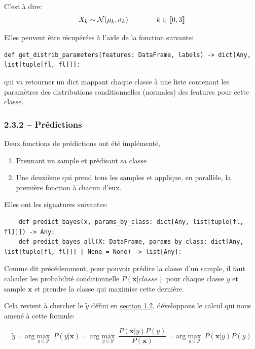 \documentclass[
]{article}
\providecommand{\tightlist}{%
  \setlength{\itemsep}{0pt}\setlength{\parskip}{0pt}}
\begin{document}
C'est à dire: \[
X_k \sim \mathcal{N}( \mu_k, \sigma_k) \qquad \qquad k \in \llbracket{0, 3}\rrbracket
\]

Elles peuvent être récupérées à l'aide de la fonction suivante:

\begin{lstlisting}
def get_distrib_parameters(features: DataFrame, labels) -> dict[Any, list[tuple[fl, fl]]]:
\end{lstlisting}

qui va retourner un dict mappant chaque classe à une liste contenant les
paramètres des distributions conditionnelles (normales) des features
pour cette classe.

\hypertarget{pruxe9dictions-1}{%
\subsubsection{2.3.2 -- Prédictions}\label{pruxe9dictions-1}}

Deux fonctions de prédictions ont été implémenté,

\begin{enumerate}
\def\labelenumi{\arabic{enumi}.}
\tightlist
\item
  Prennant un sample et prédisant sa classe
\item
  Une deuxième qui prend tous les samples et applique, en parallèle, la
  première fonction à chacun d'eux.
\end{enumerate}

Elles ont les signatures suivantes:

\begin{lstlisting}
    def predict_bayes(x, params_by_class: dict[Any, list[tuple[fl, fl]]]) -> Any:
    def predict_bayes_all(X: DataFrame, params_by_class: dict[Any, list[tuple[fl, fl]]] | None = None) -> list[Any]:
\end{lstlisting}

Comme dit précédemment, pour pouvoir prédire la classe d'un sample, il
faut calculer les probabilité conditionnelle \(P(\mathbf{x}| classe)\)
pour chaque classe \(y\) et sample \(\mathbf{x}\) et prendre la classe
qui maximise cette dernière.

Cela revient à chercher le \(\tilde{y}\) défini en
\href{#naive-bayes}{section 1.2}, développons le calcul qui nous amené à
cette formule:

\[
\tilde{y}  = \text{arg}\max_{y \in \mathcal{Y}}\ P(y|\mathbf{x}) = \text{arg}\max_{y \in \mathcal{Y}}\ \frac{P(\mathbf{x}|y)  P(y)}{P(\mathbf{x})} =  \text{arg}\max_{y \in \mathcal{Y}}\ P(\mathbf{x}| y)P(y)
\]
\end{document}
